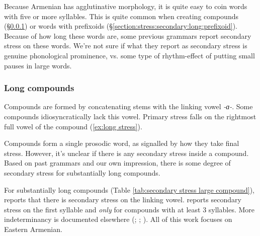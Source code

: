 Because Armenian has agglutinative morphology, it is quite easy to coin words with five or more syllables. This is quite common when creating compounds (\S\ref{section:stress:secondary:long:compound}) or words with prefixoids (\S\ref{section:stress:secondary:long:prefixoid}). Because of how long these words are, some previous grammars report secondary stress on these words. We're not sure if what they report as secondary stress is genuine phonological prominence, vs. some type of rhythm-effect of putting small pauses in large words. 

\subsubsection{Long compounds}\label{section:stress:secondary:long:compound}

Compounds are formed by concatenating  stems with the linking vowel \textit{-ɑ-}. Some compounds idiosyncratically lack this vowel.  Primary stress falls on the rightmost full vowel of the compound (\ref{ex:long stress}). 

\begin{exe}
	\ex \label{ex:long stress}
	\begin{xlist}
		\ex {}
		
		\ex {}
		
	\end{xlist}
\end{exe}


Compounds form a single prosodic word, as signalled by how they take final stress. However, it's unclear if there is any secondary stress inside a compound. Based on past grammars and our own impression, there is some degree of secondary stress for substantially long compounds. 


For substantially long compounds (Table \ref{tab:secondary stress large compound}), \citet[76]{Margaryan-1997-ArmenianPhonology}  reports that there is  secondary stress on the linking vowel.   \citet[30]{Soukyasyan-2004-ArmenianPhonology} reports secondary stress on the first syllable and \textit{only} for compounds with at least 3 syllables. More indeterminancy is documented elsewhere (\citealt[63]{Tokhmakhyan-1971-ArmenianWordStress}; \citealt[22]{Gharagulyan-1974-BookArmenianOrthoepy}; \citealt[74]{Tokhmakhyan-1983-ArmenianPhono}).  All of this work focuses on Eastern Armenian. 


